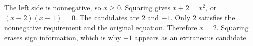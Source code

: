 The left side is nonnegative, so $x\ge0$. Squaring gives $x+2=x^2$, or $(x-2)(x+1)=0$. The candidates are $2$ and $-1$. Only $2$ satisfies the nonnegative requirement and the original equation. Therefore $\boxed{x=2}$. Squaring erases sign information, which is why $-1$ appears as an extraneous candidate.
